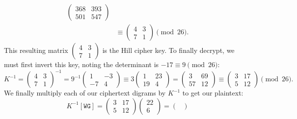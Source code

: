 \documentclass[12pt]{article}
\newenvironment{answer}
    {\begin{adjustwidth}{0pt}{0pt}}
    {\end{adjustwidth}}
\theoremstyle{remark}  %
\begin{document}
\begin{answer}
\begin{align*}
\begin{pmatrix}
                368 & 393 \\
                501 & 547
            \end{pmatrix} \\ &\equiv
            \begin{pmatrix}
                4 & 3 \\
                7 & 1
            \end{pmatrix} \pmod{26}.
        \end{align*}        
        This resulting matrix $\begin{pmatrix}
            4 & 3 \\
            7 & 1
        \end{pmatrix}$ is the Hill cipher key. To finally decrypt, we must first invert this key, noting the determinant is $-17\equiv 9\pmod{26}$: $$ K^{-1} =
            \begin{pmatrix}
                4 & 3 \\
                7 & 1
            \end{pmatrix}^{-1} = 9^{-1}
            \begin{pmatrix}
                1 & -3 \\
                -7 & 4
            \end{pmatrix} \equiv 3
            \begin{pmatrix}
                1 & 23 \\
                19 & 4
            \end{pmatrix} = 
            \begin{pmatrix}
                3 & 69 \\
                57 & 12
            \end{pmatrix} \equiv
            \begin{pmatrix}
                3 & 17 \\
                5 & 12
            \end{pmatrix} \pmod{26}.
        $$ We finally multiply each of our ciphertext digrams by $K^{-1}$ to get our plaintext: $$
        K^{-1}[\texttt{WG}] = \begin{pmatrix}
            3 & 17 \\
            5 & 12
        \end{pmatrix}
        \begin{pmatrix}
            22 \\
            6
        \end{pmatrix} = 
        \begin{pmatrix}

\end{pmatrix}$$
\end{answer}
\end{document}
